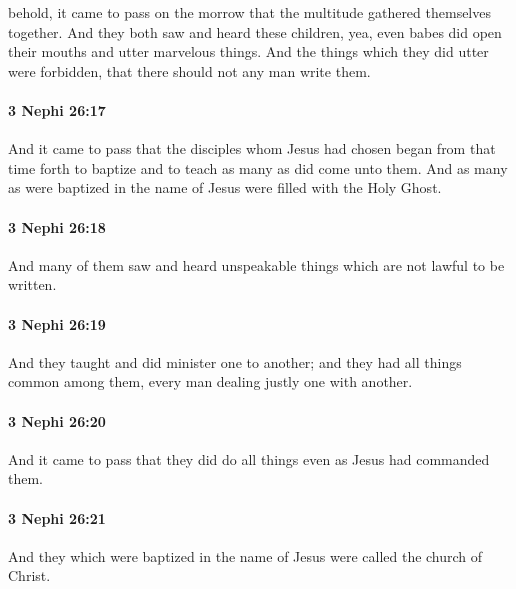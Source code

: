 			behold, it came to pass on the morrow
			that the multitude gathered themselves together.
			And they both saw and heard these children,
			yea, even babes did open their mouths and utter marvelous things.
			And the things which they did utter were forbidden,
			that there should not any man write them.

		\paragraph{3 Nephi 26:17} %
			\label{3NEPHI-26-17}

			And it came to pass that the disciples whom Jesus had chosen
			began from that time forth to baptize and to teach
			as many as did come unto them.
			And as many as were baptized in the name of Jesus
			were filled with the Holy Ghost.

		\paragraph{3 Nephi 26:18} %
			\label{3NEPHI-26-18}

			And many of them saw and heard unspeakable things
			which are not lawful to be written.

		\paragraph{3 Nephi 26:19} %
			\label{3NEPHI-26-19}

			And they taught and did minister one to another;
			and they had all things common among them,
			every man dealing justly one with another.

		\paragraph{3 Nephi 26:20} %
			\label{3NEPHI-26-20}

			And it came to pass that they did do all things
			even as Jesus had commanded them.

		\paragraph{3 Nephi 26:21} %
			\label{3NEPHI-26-21}

			And they which were baptized in the name of Jesus
			were called the church of Christ.

